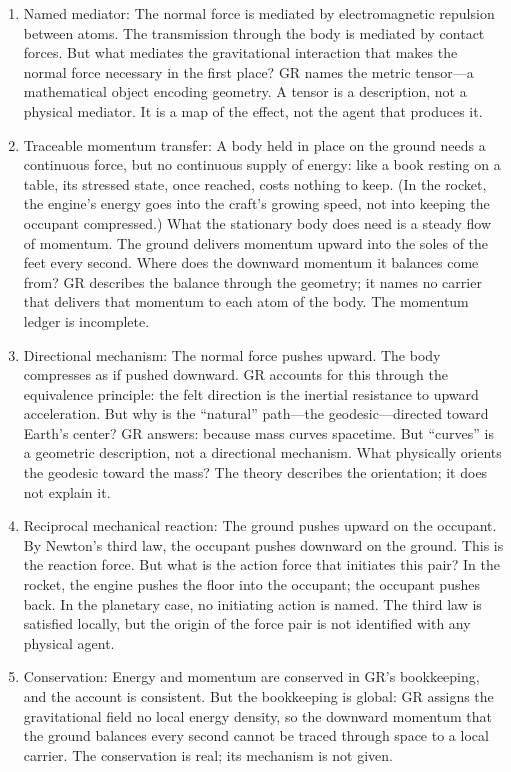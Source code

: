 \documentclass[11pt]{article}
\begin{document}
\begin{enumerate}
\def\labelenumi{\arabic{enumi}.}
\item
  Named mediator: The normal force is mediated by electromagnetic repulsion between atoms. The transmission through the body is mediated by contact forces. But what mediates the gravitational interaction that makes the normal force necessary in the first place? GR names the metric tensor---a mathematical object encoding geometry. A tensor is a description, not a physical mediator. It is a map of the effect, not the agent that produces it.
\item
  Traceable momentum transfer: A body held in place on the ground needs a continuous force, but no continuous supply of energy: like a book resting on a table, its stressed state, once reached, costs nothing to keep. (In the rocket, the engine's energy goes into the craft's growing speed, not into keeping the occupant compressed.) What the stationary body does need is a steady flow of momentum. The ground delivers momentum upward into the soles of the feet every second. Where does the downward momentum it balances come from? GR describes the balance through the geometry; it names no carrier that delivers that momentum to each atom of the body. The momentum ledger is incomplete.
\item
  Directional mechanism: The normal force pushes upward. The body compresses as if pushed downward. GR accounts for this through the equivalence principle: the felt direction is the inertial resistance to upward acceleration. But why is the ``natural'' path---the geodesic---directed toward Earth's center? GR answers: because mass curves spacetime. But ``curves'' is a geometric description, not a directional mechanism. What physically orients the geodesic toward the mass? The theory describes the orientation; it does not explain it.
\item
  Reciprocal mechanical reaction: The ground pushes upward on the occupant. By Newton's third law, the occupant pushes downward on the ground. This is the reaction force. But what is the action force that initiates this pair? In the rocket, the engine pushes the floor into the occupant; the occupant pushes back. In the planetary case, no initiating action is named. The third law is satisfied locally, but the origin of the force pair is not identified with any physical agent.
\item
  Conservation: Energy and momentum are conserved in GR's bookkeeping, and the account is consistent. But the bookkeeping is global: GR assigns the gravitational field no local energy density, so the downward momentum that the ground balances every second cannot be traced through space to a local carrier. The conservation is real; its mechanism is not given.
\end{enumerate}
\end{document}
